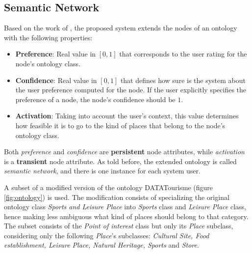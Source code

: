 \subsection{Semantic Network} \label{section:semantic_network}

Based on the work of \cite{bahramian_abbaspour_claramunt_2017}, the proposed system extends the nodes of an ontology with the following properties:
\begin{itemize}
    \item \textbf{Preference}: Real value in $[0, 1]$ that corresponds to the user rating for the node's ontology class.
    \item \textbf{Confidence}: Real value in $[0, 1]$ that defines how sure is the system about the user preference computed for the node. If the user explicitly specifies the preference of a node, the node's confidence should be $1$.
    \item \textbf{Activation}: Taking into account the user's context, this value determines how feasible it is to go to the kind of places that belong to the node's ontology class.
\end{itemize}{}
Both \textit{preference} and \textit{confidence} are \textbf{persistent} node attributes, while \textit{activation} is a \textbf{transient} node attribute. As told before, the extended ontology is called \textit{semantic network}, and there is one instance for each system user.

A subset of a modified version of the ontology DATATourisme (figure \ref{fig:ontology}) is used. The modification consists of specializing the original ontology class \textit{Sports and Leisure Place} into \textit{Sports} class and \textit{Leisure Place} class, hence making less ambiguous what kind of places should belong to that category. The subset consists of the \textit{Point of interest} class but only its \textit{Place} subclass, considering only the following \textit{Place}'s subclasses: \textit{Cultural Site, Food establishment, Leisure Place, Natural Heritage, Sports} and \textit{Store}. 


